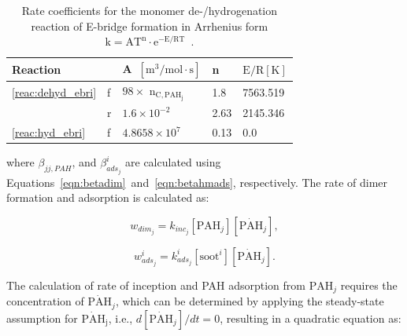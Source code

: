 \renewcommand{\arraystretch}{1.5}
\begin{table}
	\caption{Rate coefficients for the monomer de-/hydrogenation reaction of E-bridge formation in Arrhenius form $\mathrm{k=AT^n\cdot e^{-E/RT}}$~\citep{frenklach2020mechanism}.}
	\label{tab:Ebridge}
	\centering
	\begin{tabular}{l l l l l}
		\hline
		Reaction & \hspace{0.1cm} & A~$\mathrm{\left[{m^3}/{mol\cdot s} \right]}$ & n & $\mathrm{{E}/{R} [K]}$  \\
		\hline
		\eqref{reac:dehyd_ebri} & f & $98\times$ $\mathrm{n_{C, PAH_j}}$ & 1.8 & 7563.519 \\
		  & r & $1.6\times 10^{-2}$ & 2.63 & 2145.346\\
		\eqref{reac:hyd_ebri} & f & $4.8658\times10^7
		$ & 0.13 & 0.0\\
		\hline
	\end{tabular}
\end{table}

\noindent where $\beta_{jj,PAH}$, and $\beta^i_{ads_j}$ are calculated using Equations~\eqref{eqn:betadim}~and~\eqref{eqn:betahmads}, respectively. The rate of dimer formation and adsorption is calculated as:

\begin{equation}
	w_{dim_j} = k_{inc_{j}} [\mathrm{PAH}_j] [\mathrm{\dot{PAH}}_j],
	\label{eqn:wdim_ebri}
\end{equation}

\begin{equation}
	w^i_{ads_j} = k^i_{ads_{j}} [\mathrm{soot}^i] [\mathrm{\dot{PAH}}_j].
\end{equation}

The calculation of rate of inception and PAH adsorption from $\mathrm{PAH}_j$ requires the concentration of $\mathrm{\dot{PAH}}_j$, which can be determined by applying the steady-state assumption for $\mathrm{\dot{PAH}_j}$, i.e., $d[\mathrm{\dot{PAH}}_j]/dt=0$, resulting in a quadratic equation as:



